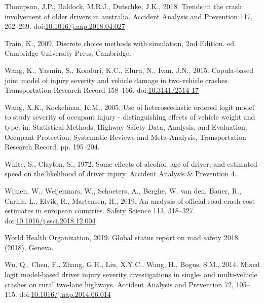\documentclass[]{elsarticle} %
\begin{document}
\leavevmode\hypertarget{ref-Thompson2018trends}{}%
Thompson, J.P., Baldock, M.R.J., Dutschke, J.K., 2018. Trends in the
crash involvement of older drivers in australia. Accident Analysis and
Prevention 117, 262--269.
doi:\href{https://doi.org/10.1016/j.aap.2018.04.027}{10.1016/j.aap.2018.04.027}

\leavevmode\hypertarget{ref-Train2009discrete}{}%
Train, K., 2009. Discrete choice methods with simulation, 2nd Edition.
ed. Cambridge University Press, Cambridge.

\leavevmode\hypertarget{ref-Wang2015copula}{}%
Wang, K., Yasmin, S., Konduri, K.C., Eluru, N., Ivan, J.N., 2015.
Copula-based joint model of injury severity and vehicle damage in
two-vehicle crashes. Transportation Research Record 158--166.
doi:\href{https://doi.org/10.3141/2514-17}{10.3141/2514-17}

\leavevmode\hypertarget{ref-Wang2005use}{}%
Wang, X.K., Kockelman, K.M., 2005. Use of heteroscedastic ordered logit
model to study severity of occupant injury - distinguishing effects of
vehicle weight and type, in: Statistical Methods; Highway Safety Data,
Analysis, and Evaluation; Occupant Protection; Systematic Reviews and
Meta-Analysis, Transportation Research Record. pp. 195--204.

\leavevmode\hypertarget{ref-White1972effects}{}%
White, S., Clayton, S., 1972. Some effects of alcohol, age of driver,
and estimated speed on the likelihood of driver injury. Accident
Analysis \& Prevention 4.

\leavevmode\hypertarget{ref-Wijnen2019analysis}{}%
Wijnen, W., Weijermars, W., Schoeters, A., Berghe, W. van den, Bauer,
R., Carnis, L., Elvik, R., Martensen, H., 2019. An analysis of official
road crash cost estimates in european countries. Safety Science 113,
318--327.
doi:\href{https://doi.org/10.1016/j.ssci.2018.12.004}{10.1016/j.ssci.2018.12.004}

\leavevmode\hypertarget{ref-WHO2019global}{}%
World Health Organization, 2019. Global status report on road safety
2018 (2018). Geneva.

\leavevmode\hypertarget{ref-Wu2014mixed}{}%
Wu, Q., Chen, F., Zhang, G.H., Liu, X.Y.C., Wang, H., Bogus, S.M., 2014.
Mixed logit model-based driver injury severity investigations in single-
and multi-vehicle crashes on rural two-lane highways. Accident Analysis
and Prevention 72, 105--115.
doi:\href{https://doi.org/10.1016/j.aap.2014.06.014}{10.1016/j.aap.2014.06.014}
\end{document}
